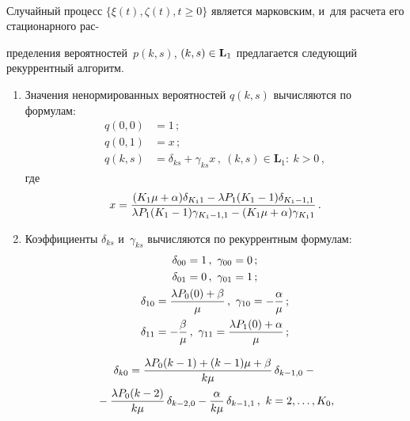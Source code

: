 \begin{multicols}{2}
\begin{figure*} %
     \vspace*{1pt}
\begin{center}
\mbox{%
\epsfxsize=146.037mm
}
\end{center}
\vspace*{-9pt}
\end{figure*}
  
  Случайный процесс $\{ \xi(t),\zeta(t), t\geq0\}$ является марковским, и~для расчета его 
стационарного рас-\linebreak\vspace*{-12pt}

\pagebreak

\noindent
пределения вероятностей~$p(k,s)$, $(k,s)\hm\in 
\mathbf{L}_1$ предлагается следующий рекуррентный алгоритм.
  \begin{enumerate}[1.]
  \item Значения ненормированных вероятностей $q(k,s)$ вычисляются по 
формулам:
  \begin{align*}
  q(0,0)&=1\,;\\
  q(0,1) &=x\,;\\
  q(k,s) & =\delta_{ks}+\gamma_{ks} x\,,\ (k,s)\in \mathbf{L}_1:\ k>0\,,
  \end{align*}
где
$$
x=\displaystyle\frac{\displaystyle (K_1\mu +\alpha)\delta_{K_11}-\lambda P_1(K_1-1)\delta_{K_1-1{,}1}\mathstrut}{\displaystyle \lambda P_1(K_1-1)\gamma_{K_1-1,1}-(K_1\mu +\alpha)\gamma_{K_11}\mathstrut}\,.
$$
\item Коэффициенты $\delta_{ks}$ и~$\gamma_{ks}$ вычисляются по 
рекуррентным формулам:
\begin{gather*}
\delta_{00}=1\,,\ \gamma_{00}=0\,;\\
\delta_{01}=0\,,\ \gamma_{01}=1\,;\\
\delta_{10}=\displaystyle\frac{\displaystyle \lambda P_0(0)+\beta\mathstrut}{\displaystyle \mu\mathstrut}\,,\ \gamma_{10}=-
\displaystyle\frac{\displaystyle \alpha\mathstrut}{\displaystyle \mu\mathstrut}\,;\\
\delta_{11}=-\displaystyle\frac{\displaystyle \beta\mathstrut}{\displaystyle \mu\mathstrut}\,,\ \gamma_{11}=\displaystyle\frac{\displaystyle \lambda 
P_1(0)+\alpha\mathstrut}{\displaystyle \mu\mathstrut}\,;
\end{gather*}

\vspace*{-12pt}

\noindent
\begin{multline*}
\delta_{k0}=\fr{\lambda P_0(k-1)+(k-1)\mu+\beta}{k\mu}\,\delta_{k-1,0} - {}\\
{}-
\fr{\lambda P_0(k-2)}{k\mu}\,\delta_{k-2,0}-\fr{\alpha}{k\mu}\,\delta_{k-1,1}\,,\ 
k=2,\ldots ,K_0,\hspace*{-0.26485pt}
\end{multline*}


\end{enumerate}
\end{multicols}
